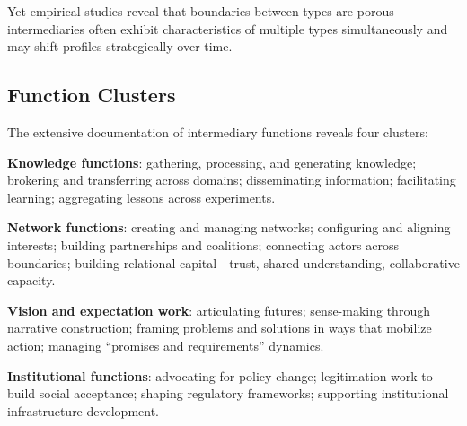 \documentclass[../main.tex]{subfiles}
\begin{document}
Yet empirical studies reveal that boundaries between types are porous---intermediaries often exhibit characteristics of multiple types simultaneously and may shift profiles strategically over time.

\subsection{Function Clusters}

The extensive documentation of intermediary functions reveals four clusters:

\textbf{Knowledge functions}: gathering, processing, and generating knowledge; brokering and transferring across domains; disseminating information; facilitating learning; aggregating lessons across experiments.

\textbf{Network functions}: creating and managing networks; configuring and aligning interests; building partnerships and coalitions; connecting actors across boundaries; building relational capital---trust, shared understanding, collaborative capacity.

\textbf{Vision and expectation work}: articulating futures; sense-making through narrative construction; framing problems and solutions in ways that mobilize action; managing ``promises and requirements'' dynamics.

\textbf{Institutional functions}: advocating for policy change; legitimation work to build social acceptance; shaping regulatory frameworks; supporting institutional infrastructure development.

\begin{center}
\label{fig:background:functions}
\end{center}
\end{document}
